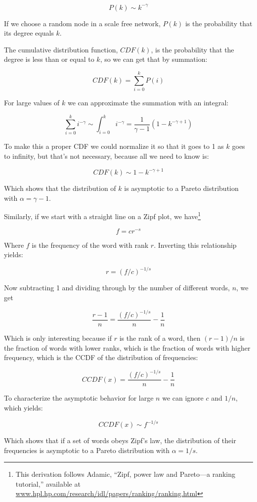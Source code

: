 \documentclass[10pt]{book}
\begin{document}
\[ P(k) \sim k^{- \gamma} \]

If we choose a random node in a scale free network,
$P(k)$ is the probability that its degree equals $k$.

The cumulative distribution function, $CDF(k)$, is the probability
that the degree is less than or equal to $k$, so we can
get that by summation:

\[ CDF(k) = \sum_{i=0}^k P(i) \]

For large values of $k$ we can approximate the summation with
an integral:

\[ \sum_{i=0}^k i^{- \gamma} \sim \int_{i=0}^k i^{- \gamma} = 
\frac{1}{\gamma -1} (1 - k^{-\gamma + 1}) \]

To make this a proper CDF we could normalize it so that it
goes to 1 as $k$ goes to infinity, but that's not necessary,
because all we need to know is:

\[ CDF(k) \sim 1 - k^{-\gamma + 1} \]

Which shows that the distribution of $k$ is asymptotic to a
Pareto distribution with $\alpha = \gamma - 1$.

Similarly, if we start with a straight line on a Zipf plot,
we have\footnote{This derivation follows
Adamic, ``Zipf, power law and
Pareto---a ranking tutorial,'' available at
\url{www.hpl.hp.com/research/idl/papers/ranking/ranking.html}}

\[ f = c r^{-s} \]

Where $f$ is the frequency of the word with rank $r$.  Inverting
this relationship yields:

\[ r = (f/c)^{-{1/s}} \]

Now subtracting 1 and dividing through by the number of different
words, $n$, we get

\[ \frac{r-1}{n} = \frac{(f/c)^{-{1/s}}}{n} - \frac{1}{n} \]

Which is only interesting because if $r$ is the rank of a word,
then $(r-1)/n$ is the fraction of words with lower ranks, which is
the fraction of words with higher frequency, which is the
CCDF of the distribution of frequencies:

\[ CCDF(x) = \frac{(f/c)^{-{1/s}}}{n} - \frac{1}{n} \]

To characterize the asymptotic behavior
for large $n$ we can ignore $c$ and $1/n$, which yields:

\[ CCDF(x) \sim f^{-{1/s}} \]

Which shows that if a set of words obeys Zipf's law, the
distribution of their frequencies is asymptotic to a
Pareto distribution with $\alpha = 1/s$.
\end{document}
